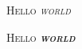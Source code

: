 \documentclass{article}
\begin{document}
\textsc{Hello \emph{world}}

\textsc{Hello \emph{\textbf{world}}}
\end{document}
